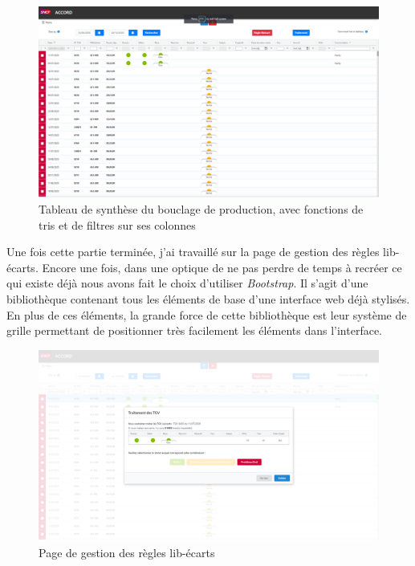   \begin{figure}[H]
    \centering
    \includegraphics[width=1\linewidth]{img/sycomores_home.png}
    \caption{Tableau de synthèse du bouclage de production, avec fonctions de tris et de filtres sur ses colonnes}
  \end{figure}

Une fois cette partie terminée, j'ai travaillé sur la page de gestion des règles lib-écarts. Encore une fois, dans une optique de ne pas perdre de temps à recréer ce qui existe déjà nous avons fait le choix d'utiliser 
\textit{Bootstrap}\cite{noauthor_bootstrap_nodate}.
Il s'agit d'une bibliothèque contenant tous les éléments de base d'une interface web déjà stylisés. En plus de ces éléments, la grande force de cette bibliothèque est leur système de grille permettant de positionner très facilement les éléments dans l'interface.

  \begin{figure}[H]
    \centering
    \includegraphics[width=1\linewidth]{img/sycomores_regle_libecart.png}
    \caption{Page de gestion des règles lib-écarts}
  \end{figure}

